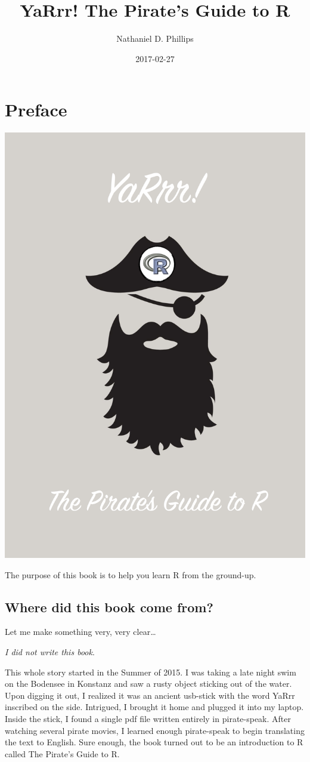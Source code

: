 \documentclass[]{book}
\title{YaRrr! The Pirate's Guide to R}
\author{Nathaniel D. Phillips}
\date{2017-02-27}
\theoremstyle{definition}
\theoremstyle{definition}
\theoremstyle{remark}
\begin{document}
\maketitle

{
\setcounter{tocdepth}{1}
\tableofcontents
}
\chapter{Preface}\label{intro}

\begin{center}\includegraphics[width=0.75\linewidth]{images/YaRrr_Cover} \end{center}

The purpose of this book is to help you learn R from the ground-up.

\section{Where did this book come
from?}\label{where-did-this-book-come-from}

Let me make something very, very clear\ldots{}

\emph{I did not write this book}.

This whole story started in the Summer of 2015. I was taking a late
night swim on the Bodensee in Konstanz and saw a rusty object sticking
out of the water. Upon digging it out, I realized it was an ancient
usb-stick with the word YaRrr inscribed on the side. Intrigued, I
brought it home and plugged it into my laptop. Inside the stick, I found
a single pdf file written entirely in pirate-speak. After watching
several pirate movies, I learned enough pirate-speak to begin
translating the text to English. Sure enough, the book turned out to be
an introduction to R called The Pirate's Guide to R.
\end{document}
